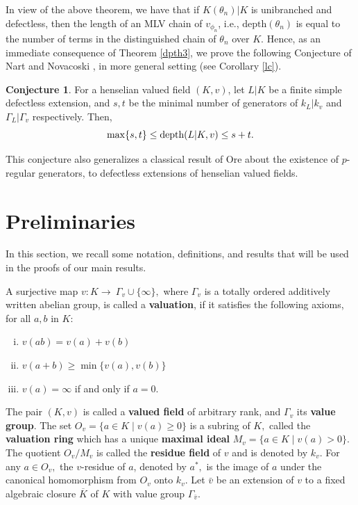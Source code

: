 \documentclass[11pt]{amsart}
\theoremstyle{definition}
\newtheorem{conjecture}[theorem]{Conjecture}
\theoremstyle{remark}
\numberwithin{equation}{section}
\begin{document}
	 In view of the above theorem, we have that if $K(\theta_n)|K$ is unibranched and defectless, then the length of an MLV chain of $v_{\phi_n}$, i.e., $\text{depth}(\theta_n)$ is equal to the number of terms in the distinguished chain of $\theta_n$ over $K.$ Hence, as an immediate consequence of Theorem \ref{dpth3}, we prove the following Conjecture of Nart and Novacoski \cite{NN}, in more general setting (see Corollary \ref{lc}).
	 \begin{conjecture}\label{1.2}
	 	For a henselian valued field $(K,v)$, let $L|K$ be a finite simple defectless extension, and $s, t$ be the minimal number of generators of $k_L|k_v$ and $\Gamma_L|\Gamma_v$ respectively. Then, \[\max\{s,t\}\leq \textup{depth}(L|K,v)\leq s+t.\]
	 \end{conjecture}
	 This conjecture also generalizes a classical result of Ore about the existence of $p$-regular generators, to defectless extensions of henselian valued fields.
	
	\section{Preliminaries}
		 In this section, we recall some notation, definitions, and results that will be used in the proofs of our main results.
		
 A surjective map $v:K \longrightarrow\ \Gamma_v\cup\{\infty\},$ where $\Gamma_v$ is a totally ordered additively written abelian group, is called a {\bf valuation}, if it satisfies the following axioms, for all $a,b$ in $K$:
	\begin{enumerate}[(i)]
		
\item $v(ab)=v(a)+v(b)$
	\item $v(a+b)\geq \min\{v(a),v(b)\}$
			\item $v(a)=\infty$ if and only if $a=0$.
	\end{enumerate}
		The pair $(K,v)$ is called a {\bf valued field} of arbitrary rank, and  $\Gamma_ v$  its {\bf value group}. The set $O_v=\{a\in K \mid v(a)\geq 0\}$ is a subring of $K,$ called the {\bf valuation ring} which has a unique {\bf maximal ideal} $M_v=\{a\in K\mid v(a)>0 \}.$ The quotient $O_v/M_v$ is called the {\bf residue field} of $v$ and is denoted by $k_v.$  For any $a\in O_v,$ the $v$-residue of $a$, denoted by $a^*,$ is the image of $a$ under the canonical homomorphism from $O_v$ onto $k_v.$ Let $\bar{v}$ be an extension of $v$ to a fixed algebraic closure $\overline{K}$ of $K$ with value group $\Gamma_{\bar{v}}.$ 
		
\end{document}

